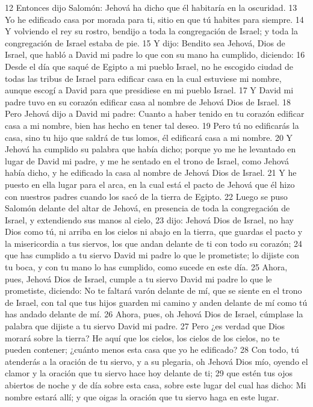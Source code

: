  
12 Entonces dijo Salomón: Jehová ha dicho que él habitaría en la oscuridad.
13 Yo he edificado casa por morada para ti, sitio en que tú habites para siempre.
14 Y volviendo el rey su rostro, bendijo a toda la congregación de Israel; y toda la congregación de Israel estaba de pie.
15 Y dijo: Bendito sea Jehová, Dios de Israel, que habló a David mi padre lo que con su mano ha cumplido, diciendo:
16 Desde el día que saqué de Egipto a mi pueblo Israel, no he escogido ciudad de todas las tribus de Israel para edificar casa en la cual estuviese mi nombre, aunque escogí a David para que presidiese en mi pueblo Israel. 
17 Y David mi padre tuvo en su corazón edificar casa al nombre de Jehová Dios de Israel.
18 Pero Jehová dijo a David mi padre: Cuanto a haber tenido en tu corazón edificar casa a mi nombre, bien has hecho en tener tal deseo. 
19 Pero tú no edificarás la casa, sino tu hijo que saldrá de tus lomos, él edificará casa a mi nombre. 
20 Y Jehová ha cumplido su palabra que había dicho; porque yo me he levantado en lugar de David mi padre, y me he sentado en el trono de Israel, como Jehová había dicho, y he edificado la casa al nombre de Jehová Dios de Israel.
21 Y he puesto en ella lugar para el arca, en la cual está el pacto de Jehová que él hizo con nuestros padres cuando los sacó de la tierra de Egipto.
22 Luego se puso Salomón delante del altar de Jehová, en presencia de toda la congregación de Israel, y extendiendo sus manos al cielo,
23 dijo: Jehová Dios de Israel, no hay Dios como tú, ni arriba en los cielos ni abajo en la tierra, que guardas el pacto y la misericordia a tus siervos, los que andan delante de ti con todo su corazón;
24 que has cumplido a tu siervo David mi padre lo que le prometiste; lo dijiste con tu boca, y con tu mano lo has cumplido, como sucede en este día.
25 Ahora, pues, Jehová Dios de Israel, cumple a tu siervo David mi padre lo que le prometiste, diciendo: No te faltará varón delante de mí, que se siente en el trono de Israel, con tal que tus hijos guarden mi camino y anden delante de mí como tú has andado delante de mí.
26 Ahora, pues, oh Jehová Dios de Israel, cúmplase la palabra que dijiste a tu siervo David mi padre.
27 Pero ¿es verdad que Dios morará sobre la tierra? He aquí que los cielos, los cielos de los cielos, no te pueden contener; ¿cuánto menos esta casa que yo he edificado? 
28 Con todo, tú atenderás a la oración de tu siervo, y a su plegaria, oh Jehová Dios mío, oyendo el clamor y la oración que tu siervo hace hoy delante de ti;
29 que estén tus ojos abiertos de noche y de día sobre esta casa, sobre este lugar del cual has dicho: Mi nombre estará allí; y que oigas la oración que tu siervo haga en este lugar.
